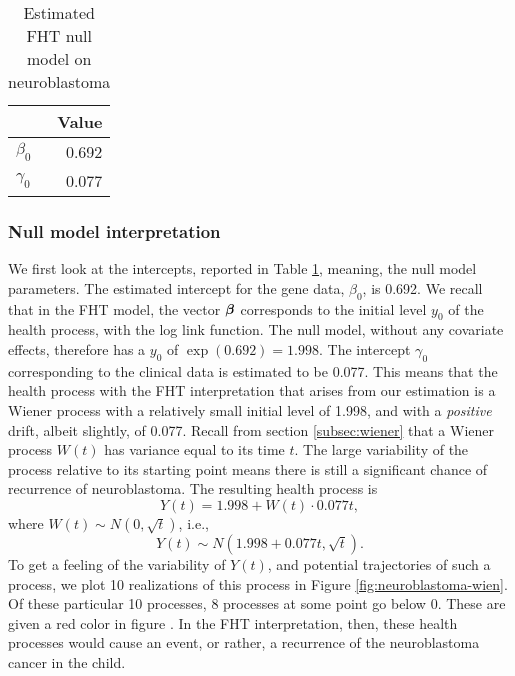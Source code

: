 \begin{table}
\caption{Estimated FHT null model on neuroblastoma \citep{oberthuer-data}}
\label{tab:neuroblastoma-intercepts}
\centering
\begin{tabular}{lr}
\toprule
  & Value\\
\hline
$\beta_0$ & 0.692 \\
$\gamma_0$ & 0.077 \\
\bottomrule
\end{tabular}
\end{table}

\subsubsection{Null model interpretation}
We first look at the intercepts, reported in Table \ref{tab:neuroblastoma-intercepts}, meaning, the null model parameters.
The estimated intercept for the gene data, $\beta_0$, is 0.692.
We recall that in the FHT model, the vector $\boldsymbol{\beta}$ corresponds to the initial level $y_0$ of the health process, with the log link function.
The null model, without any covariate effects, therefore has a $y_0$ of $\exp(0.692)=1.998$.
The intercept $\gamma_0$ corresponding to the clinical data is estimated to be 0.077.
This means that the health process with the FHT interpretation that arises from our estimation is a Wiener process with a relatively small initial level of 1.998, and with a \textit{positive} drift, albeit slightly, of 0.077.
Recall from section \ref{subsec:wiener} that a Wiener process $W(t)$ has variance equal to its time $t$.
The large variability of the process relative to its starting point means there is still a significant chance of recurrence of neuroblastoma.
The resulting health process is
\begin{equation*}
    Y(t)=1.998+W(t)\cdot0.077t,
\end{equation*}
where $W(t)\sim N(0,\sqrt{t})$,
i.e.,
\begin{equation*}
    Y(t)\sim N(1.998+0.077t,\sqrt{t}).
\end{equation*}
To get a feeling of the variability of $Y(t)$, and potential trajectories of such a process, we plot 10 realizations of this process in Figure \ref{fig:neuroblastoma-wien}.
Of these particular 10 processes, 8 processes at some point go below 0.
These are given a red color in figure \label{fig:neuroblastoma-wien}.
In the FHT interpretation, then, these health processes would cause an event, or rather, a recurrence of the neuroblastoma cancer in the child.
